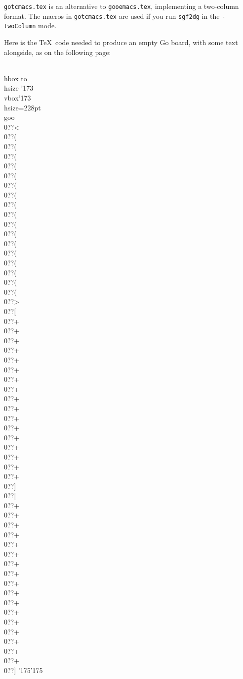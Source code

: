 {\tt gotcmacs.tex} is an alternative to {\tt gooemacs.tex}, implementing
a two-column format. The macros in {\tt gotcmacs.tex} are used if you run
{\tt sgf2dg} in the {\tt -twoColumn} mode.

Here is the \TeX\ code needed to produce an empty Go board, with some text
alongside, as on the following page:

\vfil
{\seventtt\parindent=0pt\baselineskip=9pt\obeylines
\def\[{{\char'173}}
\def\]{{\char'175}}
\\hbox to \\hsize \[\\vbox\[\\hsize=228pt\\goo
\\0??<\\0??(\\0??(\\0??(\\0??(\\0??(\\0??(\\0??(\\0??(\\0??(\\0??(\\0??(\\0??(\\0??(\\0??(\\0??(\\0??(\\0??(\\0??>
\\0??[\\0??+\\0??+\\0??+\\0??+\\0??+\\0??+\\0??+\\0??+\\0??+\\0??+\\0??+\\0??+\\0??+\\0??+\\0??+\\0??+\\0??+\\0??]
\\0??[\\0??+\\0??+\\0??+\\0??+\\0??+\\0??+\\0??+\\0??+\\0??+\\0??+\\0??+\\0??+\\0??+\\0??+\\0??+\\0??+\\0??+\\0??]
\]\]}
